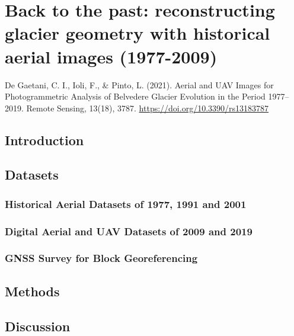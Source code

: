 \graphicspath{{figures/chapter2/}}

\chapter{Back to the past: reconstructing glacier geometry with historical aerial images
  (1977-2009)}\label{ch:2}

\vfill


\noindent De Gaetani, C. I., Ioli, F., \& Pinto, L. (2021). Aerial and UAV Images for
Photogrammetric Analysis of Belvedere Glacier Evolution in the Period 1977–2019. Remote
Sensing, 13(18), 3787. \url{https://doi.org/10.3390/rs13183787}

\newpage

\section{Introduction}\label{sec:2:introduction}

\section{Datasets}\label{sec:2:datasets}

\subsection{Historical Aerial Datasets of 1977, 1991 and 2001}

\subsection{Digital Aerial and UAV Datasets of 2009 and 2019}

\subsection{GNSS Survey for Block Georeferencing}

\section{Methods}\label{sec:2:methods}

\section{Discussion}\label{sec:2:discussion}

% 
% 
